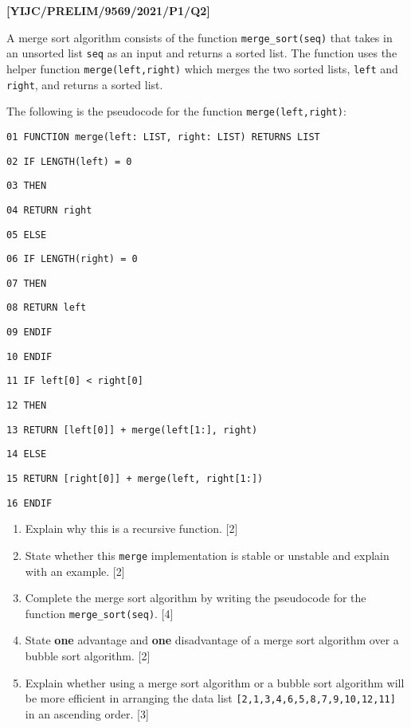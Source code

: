\item \textbf{{[}YIJC/PRELIM/9569/2021/P1/Q2{]} }

A merge sort algorithm consists of the function \texttt{merge\_sort(seq)}
that takes in an unsorted list \texttt{seq} as an input and returns
a sorted list. The function uses the helper function \texttt{merge(left,right)}
which merges the two sorted lists, \texttt{left} and \texttt{right},
and returns a sorted list. 

The following is the pseudocode for the function \texttt{merge(left,right)}: 

\noindent\begin{minipage}[t]{1\columnwidth}%
\texttt{01 FUNCTION merge(left: LIST, right: LIST) RETURNS LIST }

\texttt{02 \qquad{}IF LENGTH(left) = 0 }

\texttt{03 \qquad{}\qquad{}THEN }

\texttt{04\qquad{}\qquad{}\qquad{} RETURN right }

\texttt{05 \qquad{}\qquad{}ELSE }

\texttt{06\qquad{}\qquad{}\qquad{} IF LENGTH(right) = 0 }

\texttt{07 \qquad{}\qquad{}\qquad{}\qquad{}THEN }

\texttt{08\qquad{}\qquad{}\qquad{}\qquad{}\qquad{} RETURN left }

\texttt{09 \qquad{}\qquad{}\qquad{}ENDIF }

\texttt{10 \qquad{}ENDIF }

\texttt{11 \qquad{}IF left{[}0{]} < right{[}0{]} }

\texttt{12 \qquad{}\qquad{}THEN }

\texttt{13\qquad{}\qquad{}\qquad{} RETURN {[}left{[}0{]}{]} + merge(left{[}1:{]},
right) }

\texttt{14 \qquad{}\qquad{}ELSE }

\texttt{15 \qquad{}\qquad{}\qquad{}RETURN {[}right{[}0{]}{]} +
merge(left, right{[}1:{]}) }

\texttt{16 \qquad{}ENDIF }%
\end{minipage} 
\begin{enumerate}
\item Explain why this is a recursive function. \hfill{}{[}2{]} 
\item State whether this \texttt{merge} implementation is stable or unstable
and explain with an example. \hfill{}{[}2{]} 
\item Complete the merge sort algorithm by writing the pseudocode for the
function \texttt{merge\_sort(seq)}. \hfill{}{[}4{]} 
\item State \textbf{one} advantage and \textbf{one} disadvantage of a merge
sort algorithm over a bubble sort algorithm. \hfill{} {[}2{]} 
\item Explain whether using a merge sort algorithm or a bubble sort algorithm
will be more efficient in arranging the data list \texttt{{[}2,1,3,4,6,5,8,7,9,10,12,11{]}}
in an ascending order. \hfill{}{[}3{]}
\end{enumerate}